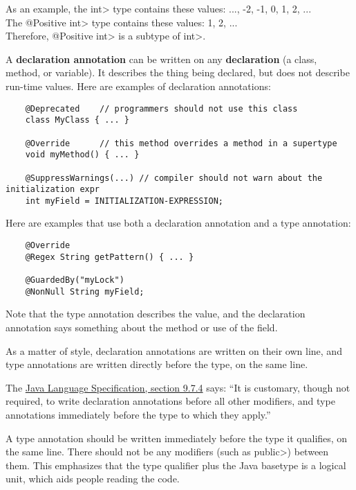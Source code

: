 As an example, the \<int> type contains these values: ..., -2, -1, 0, 1, 2, ...  \\
The \<@Positive int> type contains these values:  1, 2, ...   \\
Therefore, \<@Positive int> is a subtype of \<int>.

A \textbf{declaration annotation} can be written on any \textbf{declaration} (a class, method, or variable).  It describes the thing being declared, but does not describe run-time values.  Here are examples of declaration annotations:

\begin{Verbatim}
    @Deprecated    // programmers should not use this class
    class MyClass { ... }

    @Override      // this method overrides a method in a supertype
    void myMethod() { ... }

    @SuppressWarnings(...) // compiler should not warn about the initialization expr
    int myField = INITIALIZATION-EXPRESSION;
\end{Verbatim}

Here are examples that use both a declaration annotation and a type annotation:

\begin{Verbatim}
    @Override
    @Regex String getPattern() { ... }

    @GuardedBy("myLock")
    @NonNull String myField;
\end{Verbatim}

Note that the type annotation describes the value, and the declaration annotation says something about the method or use of the field.

As a matter of style, declaration annotations are written on their own line, and type annotations are written directly before the type, on the same line.



The
\href{https://docs.oracle.com/javase/specs/jls/se8/html/jls-9.html#jls-9.7.4}{Java
  Language Specification, section 9.7.4} says:  ``It is customary, though
not required, to write declaration annotations before all other modifiers,
and type annotations immediately before the type to which they apply.''

A type annotation should be written immediately before the type it
qualifies, on the same line.  There should not be any modifiers (such as
\<public>) between them.  This emphasizes that the type qualifier plus the
Java basetype is a logical unit, which aids people reading the code.

